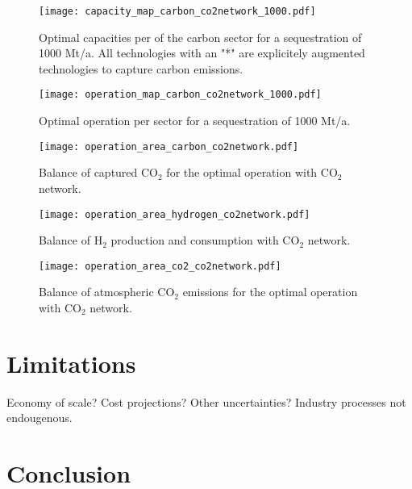 \documentclass[conference]{IEEEtran}
\begin{document}
\begin{figure}[h]
    \centering
    \texttt{[image: capacity\_map\_carbon\_co2network\_1000.pdf]}
    \caption{Optimal capacities per of the carbon sector for a sequestration of 1000 Mt/a. All technologies with an "*" are explicitely augmented technologies to capture carbon emissions.}
    \label{fig:capacity_map_carbon_co2network_1000}
\end{figure}



\begin{figure*}[h]
    \centering
    \texttt{[image: operation\_map\_carbon\_co2network\_1000.pdf]}
    \caption{Optimal operation per sector for a sequestration of 1000 Mt/a.}
    \label{fig:operation_map_noco2network_1000}
\end{figure*}


\begin{figure}
    \centering
    \texttt{[image: operation\_area\_carbon\_co2network.pdf]}
    \caption{Balance of captured CO$_2$ for the optimal operation with CO$_2$ network.}
    \label{fig:operation_area_carbon_co2network}
\end{figure}


\begin{figure}
    \centering
    \texttt{[image: operation\_area\_hydrogen\_co2network.pdf]}
    \caption{Balance of H$_2$ production and consumption with CO$_2$ network.}
    \label{fig:operation_area_hydrogen_co2network}
\end{figure}



\begin{figure}
    \centering
    \texttt{[image: operation\_area\_co2\_co2network.pdf]}
    \caption{Balance of atmospheric CO$_2$ emissions for the optimal operation with CO$_2$ network.}
    \label{fig:operation_area_co2_co2network}
\end{figure}




\section{Limitations}
\label{sec:limitations}
Economy of scale? Cost projections? Other uncertainties?
Industry processes not endougenous.

\section{Conclusion}
\label{sec:conclusion}
\end{document}
